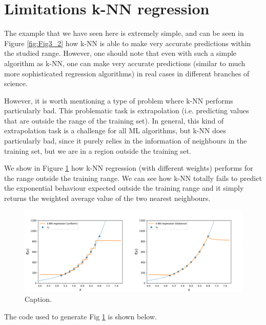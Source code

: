 \documentclass{article}%
\begin{document}
\section{Limitations k-NN regression}
The example that we have seen here is extremely simple, and can be seen in Figure \ref{fig:Fig3_2} how k-NN is able to make very accurate predictions within the studied range. However, one should note that even with such a simple algorithm as k-NN, one can make very accurate predictions (similar to much more sophisticated regression algorithms) in real cases in different branches of science.

However, it is worth mentioning a type of problem where k-NN performs particularly bad. This problematic task is extrapolation (i.e. predicting values that are outside the range of the training set). In general, this kind of extrapolation task is a challenge for all ML algorithms, but k-NN does particularly bad, since it purely relies in the information of neighbours in the training set, but we are in a region outside the training set.

We show in Figure \ref{fig:Fig4} how k-NN regression (with different weights) performs for the range outside the training range. We can see how k-NN totally fails to predict the exponential behaviour expected outside the training range and it simply returns the weighted average value of the two nearest neighbours.

\begin{figure}[!htbp]
	\centering
	\includegraphics[width=1.0\textwidth]{figures/Fig4.png}
	\caption{Caption.}
	\label{fig:Fig4}
\end{figure}

The code used to generate Fig \ref{fig:Fig4} is shown below.
\end{document}
